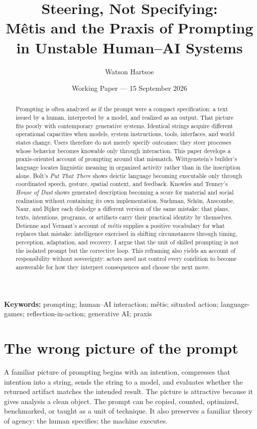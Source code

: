 \documentclass[11pt]{article}
\title{Steering, Not Specifying:\\M\^etis and the Praxis of Prompting in Unstable Human--AI Systems}
\author{Watson Hartsoe}
\date{Working Paper --- 15 September 2026}
\begin{document}
\maketitle

\begin{abstract}
Prompting is often analyzed as if the prompt were a compact specification: a text issued by a human, interpreted by a model, and realized as an output. That picture fits poorly with contemporary generative systems. Identical strings acquire different operational capacities when models, system instructions, tools, interfaces, and world states change. Users therefore do not merely specify outcomes; they steer processes whose behavior becomes knowable only through interaction. This paper develops a praxis-oriented account of prompting around that mismatch. Wittgenstein's builder's language locates linguistic meaning in organized activity rather than in the inscription alone. Bolt's \emph{Put That There} shows deictic language becoming executable only through coordinated speech, gesture, spatial context, and feedback. Knowles and Tenney's \emph{House of Dust} shows generated description becoming a score for material and social realization without containing its own implementation. Suchman, Sch\"on, Anscombe, Naur, and Bijker each dislodge a different version of the same mistake: that plans, texts, intentions, programs, or artifacts carry their practical identity by themselves. Detienne and Vernant's account of \emph{m\^etis} supplies a positive vocabulary for what replaces that mistake: intelligence exercised in shifting circumstances through timing, perception, adaptation, and recovery. I argue that the unit of skilled prompting is not the isolated prompt but the corrective loop. This reframing also yields an account of responsibility without sovereignty: actors need not control every condition to become answerable for how they interpret consequences and choose the next move.
\end{abstract}

\textbf{Keywords:} prompting; human--AI interaction; m\^etis; situated action; language-games; reflection-in-action; generative AI; praxis

\section{The wrong picture of the prompt}
A familiar picture of prompting begins with an intention, compresses that intention into a string, sends the string to a model, and evaluates whether the returned artifact matches the intended result. The picture is attractive because it gives analysis a clean object. The prompt can be copied, counted, optimized, benchmarked, or taught as a unit of technique. It also preserves a familiar theory of agency: the human specifies; the machine executes.
\end{document}

